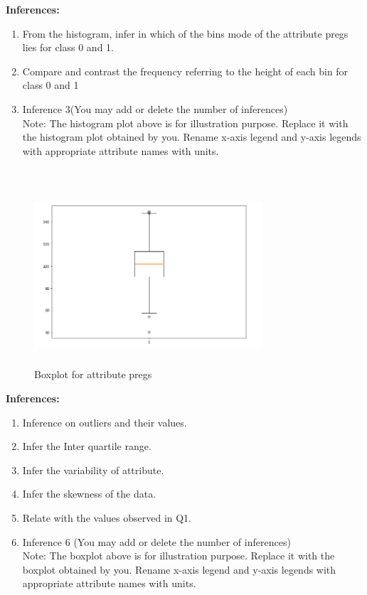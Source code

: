 \documentclass[12 pt, a4paper]{article}
\theoremstyle{definition}
\begin{document}
\textbf{\Large Inferences:}
\begin{enumerate}
   \item From the histogram, infer in which of the bins mode of the attribute pregs lies for class 0 and 1.
   \item Compare and contrast the frequency referring to the height of each bin for class 0 and 1
   \item Inference 3(You may add or delete the number of inferences)
\\Note: The histogram plot above is for illustration purpose. Replace it with the histogram plot obtained by you. Rename x-axis legend and y-axis legends with appropriate attribute names with units.

\end{enumerate}

\section{}

\begin{figure}[H]
	\centering
	\includegraphics[width=8.5cm,height=6.65cm]{boxplot.png}
	\caption{Boxplot for attribute pregs}
	\label{Blockdia}
\end{figure}

\textbf{\Large Inferences:}
\begin{enumerate}
   \item Inference on outliers and their values.
   \item Infer the Inter quartile range.
   \item Infer the variability of attribute.
   \item Infer the skewness of the data.
 \item Relate with the values observed in Q1. \item Inference 6 (You may add or delete the number of inferences)
\\Note: The boxplot above is for illustration purpose. Replace it with the boxplot obtained by you. Rename x-axis legend and y-axis legends with appropriate attribute names with units.

\end{enumerate}
\end{document}
